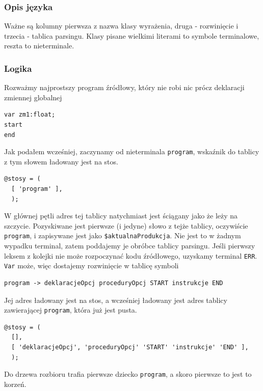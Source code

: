 \documentclass[a4paper,12pt]{article}
\begin{document}
\subsubsection{Opis języka}
Ważne są kolumny pierwsza z nazwa klasy wyrażenia, druga - rozwinięcie i trzecia - tablica parsingu. Klasy pisane wielkimi literami to symbole terminalowe, reszta to nieterminale.
\subsubsection{Logika}
Rozważmy najprostszy program źródłowy, który nie robi nic prócz deklaracji zmiennej globalnej
\begin{verbatim}
var zm1:float;
start
end
\end{verbatim}
Jak podałem wcześniej, zaczynamy od nieterminala \verb|program|, wskaźnik do tablicy z tym słowem ładowany jest na stos.
\begin{verbatim}
@stosy = (
  [ 'program' ],
  );
\end{verbatim}
W głównej pętli adres tej tablicy natychmiast jest ściągany jako że leży na szczycie. Pozyskiwane jest pierwsze (i jedyne) słowo z tejże tablicy, oczywiście \verb|program|, i zapisywane jest jako \verb|$aktualnaProdukcja|. Nie jest to w żadnym wypadku terminal, zatem poddajemy je obróbce tablicy parsingu. Jeśli pierwszy leksem z kolejki nie może rozpoczynać kodu źródłowego, uzyskamy terminal \verb|ERR|. \verb|Var| może, więc dostajemy rozwinięcie w tablicę symboli

\begin{verbatim}
program -> deklaracjeOpcj proceduryOpcj START instrukcje END
\end{verbatim}
Jej adres ładowany jest na stos, a wcześniej ładowany jest adres tablicy zawierającej \verb|program|, która już jest pusta.
\begin{verbatim}
@stosy = (
  [],
  [ 'deklaracjeOpcj', 'proceduryOpcj' 'START' 'instrukcje' 'END' ],
  );
\end{verbatim}
Do drzewa rozbioru trafia pierwsze dziecko \verb|program|, a skoro pierwsze to jest to korzeń.
\end{document}
